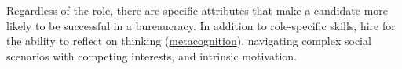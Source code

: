 
Regardless of the role, there are specific attributes that make a candidate more likely to be successful in a bureaucracy. In addition to role-specific skills, hire for the ability to reflect on thinking (\href{https://en.wikipedia.org/wiki/Metacognition}{metacognition}),
\iftoggle{WPinmargin}{\marginpar{$>$Wikipedia: Metacognition}}{}
navigating complex social scenarios with competing interests, and intrinsic motivation.




